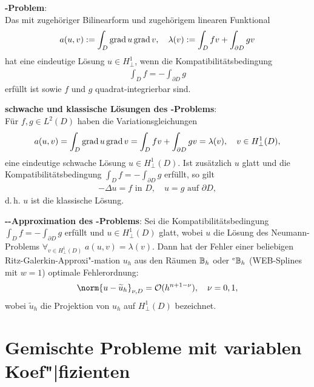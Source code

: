 \linie

\textbf{-Problem}:\\
Das  mit zugehöriger Bilinearform und zugehörigem linearen
Funktional
\begin{align*}
    a(u, v) := \int_D \operatorname{grad} u \operatorname{grad} v,\quad
    \lambda(v) := \int_D fv + \int_{\partial D} gv
\end{align*}
hat eine eindeutige Lösung $u \in H_\perp^1$, wenn die Kompatibilitätsbedingung
\begin{align*}
    \int_D f = -\int_{\partial D} g
\end{align*}
erfüllt ist sowie $f$ und $g$ quadrat-integrierbar sind.

\linie

\textbf{schwache und klassische Lösungen des -Problems}:\\
Für $f, g \in L^2(D)$ haben die Variationsgleichungen
\begin{align*}
    a(u, v) = \int_D \operatorname{grad} u \operatorname{grad} v = \int_D fv + \int_{\partial D} gv = \lambda(v),\quad
    v \in H_\perp^1(D),
\end{align*}
eine eindeutige schwache Lösung $u \in H_\perp^1(D)$.
Ist zusätzlich $u$ glatt und die Kompatibilitätsbedingung
$\int_D f = -\int_{\partial D} g$ erfüllt, so gilt
\begin{align*}
    -\Delta u = f \text{ in } D,\quad
    u = g \text{ auf } \partial D,
\end{align*}
d.\,h. $u$ ist die klassische Lösung.

\linie

\textbf{--Approximation des -Problems}:
Sei die Kompatibilitätsbedingung $\int_D f = -\int_{\partial D} g$ erfüllt und $u \in H_\perp^1(D)$
glatt, wobei $u$ die Lösung des Neumann-Problems
$\forall_{v \in H_\perp^1(D)}\; a(u, v) = \lambda(v)$.
Dann hat der Fehler einer beliebigen Ritz-Galerkin-Approxi"-mation $u_h$ aus den Räumen $\mathbb{B}_h$ oder
${}^{\mathrm{e}}\mathbb{B}_h$ (WEB-Splines mit $w = 1$) optimale Fehlerordnung:
\begin{align*}
    \norm{u - \widetilde{u}_h}_{\nu,D} = \O(h^{n+1-\nu}),\quad
    \nu = 0, 1,
\end{align*}
wobei $\widetilde{u}_h$ die Projektion von $u_h$ auf $H_\perp^1(D)$ bezeichnet.

\pagebreak

\section{%
    Gemischte Probleme mit variablen Koef"|fizienten%
}

